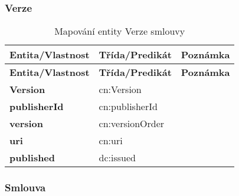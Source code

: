 \subsubsection*{Verze}

\begin{center}
\begin{longtable}{lp{30mm}p{65mm}}
\label{grid_mlmmh} \\
\multicolumn{1}{l}{\textbf{Entita/Vlastnost}} & 
\multicolumn{1}{l}{\textbf{Třída/Predikát}} & 
\multicolumn{1}{l}{\textbf{Poznámka}} \\ \hline 
\endfirsthead
\multicolumn{1}{l}{\textbf{Entita/Vlastnost}} & 
\multicolumn{1}{l}{\textbf{Třída/Predikát}} & 
\multicolumn{1}{l}{\textbf{Poznámka}} \\ \hline 
\hline
\endhead
\endfoot
\caption{Mapování entity Verze smlouvy}
\endlastfoot
\textbf{Version} & cn:Version & \\
\textbf{publisherId} & cn:publisherId & \\
\textbf{version} & cn:versionOrder \\
\textbf{uri} & cn:uri \\
\textbf{published} & dc:issued \\
\end{longtable}
\end{center}

\subsubsection*{Smlouva}

